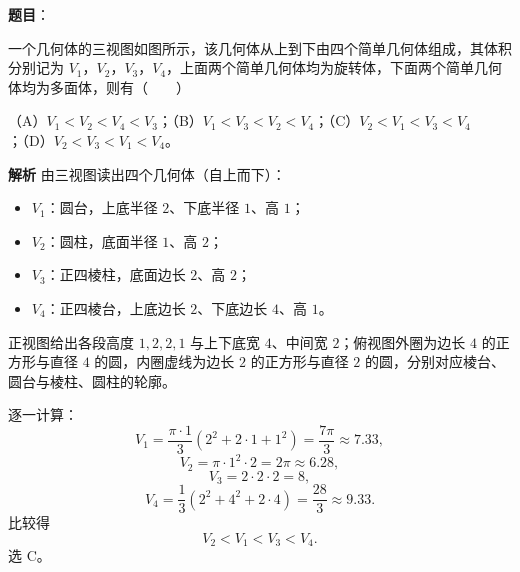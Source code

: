\begin{answer}

\textbf{题目}：

一个几何体的三视图如图所示，该几何体从上到下由四个简单几何体组成，其体积分别记为 $V_1$，$V_2$，$V_3$，$V_4$，上面两个简单几何体均为旋转体，下面两个简单几何体均为多面体，则有\mbox{（　　）}
\nopagebreak[4]
\begin{center}\end{center}
\nopagebreak[4]
（A）$V_1<V_2<V_4<V_3$；（B）$V_1<V_3<V_2<V_4$；（C）$V_2<V_1<V_3<V_4$；（D）$V_2<V_3<V_1<V_4$。

\textbf{解析}
由三视图读出四个几何体（自上而下）：

\begin{itemize}
\item $V_1$：圆台，上底半径 $2$、下底半径 $1$、高 $1$；
\item $V_2$：圆柱，底面半径 $1$、高 $2$；
\item $V_3$：正四棱柱，底面边长 $2$、高 $2$；
\item $V_4$：正四棱台，上底边长 $2$、下底边长 $4$、高 $1$。
\end{itemize}

正视图给出各段高度 $1,2,2,1$ 与上下底宽 $4$、中间宽 $2$；俯视图外圈为边长 $4$ 的正方形与直径 $4$ 的圆，内圈虚线为边长 $2$ 的正方形与直径 $2$ 的圆，分别对应棱台、圆台与棱柱、圆柱的轮廓。

逐一计算：
\nopagebreak[4]
\[V_1=\frac{\pi\cdot1}{3}\left(2^2+2\cdot1+1^2\right)=\frac{7\pi}{3}\approx7.33,\]
\nopagebreak[4]
\[V_2=\pi\cdot1^2\cdot2=2\pi\approx6.28,\]
\nopagebreak[4]
\[V_3=2\cdot2\cdot2=8,\]
\nopagebreak[4]
\[V_4=\frac13\left(2^2+4^2+2\cdot4\right)=\frac{28}{3}\approx9.33.\]
比较得
\nopagebreak[4]
\[V_2<V_1<V_3<V_4.\]
选 C。


\end{answer}
